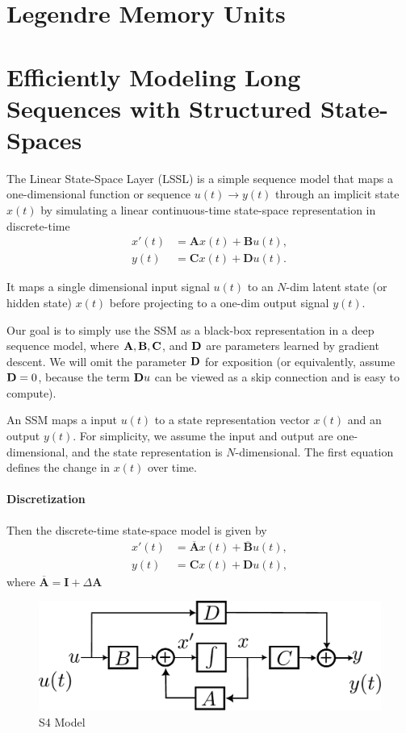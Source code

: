 \section{Legendre Memory Units}
\label{sec:nlp_lmu}


\section{Efficiently Modeling Long Sequences with Structured State-Spaces}
\label{sec:nlp_ssm}
The Linear State-Space Layer (LSSL) is a simple sequence model that maps a one-dimensional function  or sequence $u(t)\to y(t)$ through an implicit state $x(t)$ by simulating a linear continuous-time state-space representation in discrete-time
\begin{align*}
	x'(t) &= \mathbf{A}x(t)+\mathbf{B}u(t),\\
	y(t) &= \mathbf{C}x(t)+\mathbf{D}u(t).
\end{align*}

It maps a single dimensional input signal $u(t)$ to an $N$-dim latent state (or hidden state) $x(t)$ before projecting to a one-dim output signal $y(t)$.  

Our goal is to simply use the SSM as a black-box representation in a deep sequence model, where ${\mathbf{A}}, {\mathbf{B}}, {\mathbf{C}}$, and ${\mathbf{D}}$ are parameters learned by gradient descent. We will omit the parameter ${\mathbf{D}}$ for exposition (or equivalently, assume ${\mathbf{D}}=0$, because the term ${\mathbf{D}} u$ can be viewed as a skip connection and is easy to compute).

An SSM maps a input $u(t)$ to a state representation vector $x(t)$ and an output $y(t)$. For simplicity, we assume the input and output are one-dimensional, and the state representation is $N$-dimensional. The first equation defines the change in $x(t)$ over time.

\paragraph{Discretization} Then the discrete-time state-space model is given by
\begin{align*}
	x'(t) &= \overline{\mathbf{A}}x(t)+\overline{\mathbf{B}}u(t),\\
	y(t) &= \mathbf{C}x(t)+\mathbf{D}u(t),
\end{align*}
where $\overline{\mathbf{A}} = \mathbf{I}+\Delta \mathbf{A}$

\begin{figure}[h]
	\centering
	\includegraphics[scale=0.6]{./images/nlp/ssm.pdf}
	\caption{S4 Model}
	\label{fig:nlp_s4_model}
\end{figure}
